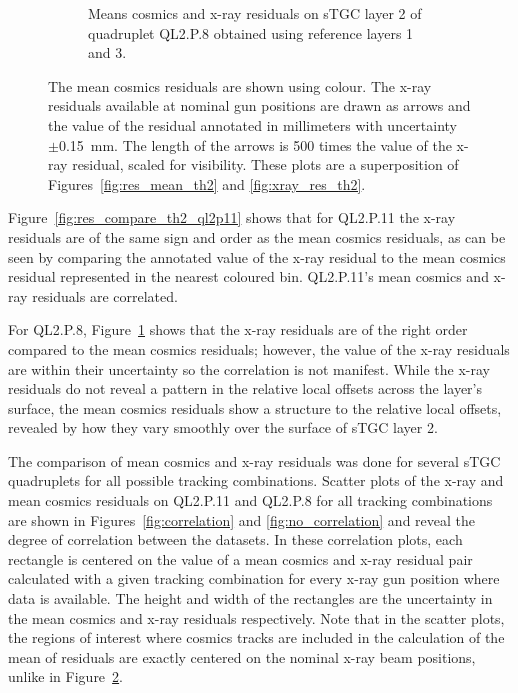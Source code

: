 \begin{figure}
\begin{subfigure}{\textwidth}
  \caption{Means cosmics and x-ray residuals on sTGC layer 2 of quadruplet QL2.P.8 obtained using reference layers 1 and 3.}
  \label{fig:res_compare_th2_ql2p8}
\end{subfigure}
\caption{The mean cosmics residuals are shown using colour. The x-ray residuals available at nominal gun positions are drawn as arrows and the value of the residual annotated in millimeters with uncertainty $\pm$\SI{0.15}{mm}. The length of the arrows is 500 times the value of the x-ray residual, scaled for visibility. These plots are a superposition of Figures~\ref{fig:res_mean_th2} and \ref{fig:xray_res_th2}.}
\label{fig:res_compare_th2}
\end{figure}
\newpage
\restoregeometry

Figure~\ref{fig:res_compare_th2_ql2p11} shows that for QL2.P.11 the x-ray residuals are of the same sign and order as the mean cosmics residuals, as can be seen by comparing the annotated value of the x-ray residual to the mean cosmics residual represented in the nearest coloured bin. QL2.P.11's mean cosmics and x-ray residuals are correlated. 

For QL2.P.8, Figure~\ref{fig:res_compare_th2_ql2p8} shows that the x-ray residuals are of the right order compared to the mean cosmics residuals; however, the value of the x-ray residuals are within their uncertainty so the correlation is not manifest. While the x-ray residuals do not reveal a pattern in the relative local offsets across the layer's surface, the mean cosmics residuals show a structure to the relative local offsets, revealed by how they vary smoothly over the surface of sTGC layer 2. 

The comparison of mean cosmics and x-ray residuals was done for several sTGC quadruplets for all possible tracking combinations. Scatter plots of the x-ray and mean cosmics residuals on QL2.P.11 and QL2.P.8 for all tracking combinations are shown in Figures~\ref{fig:correlation} and \ref{fig:no_correlation} and reveal the degree of correlation between the datasets. In these correlation plots, each rectangle is centered on the value of a mean cosmics and x-ray residual pair calculated with a given tracking combination for every x-ray gun position where data is available. The height and width of the rectangles are the uncertainty in the mean cosmics and x-ray residuals respectively. Note that in the scatter plots, the regions of interest where cosmics tracks are included in the calculation of the mean of residuals are exactly centered on the nominal x-ray beam positions, unlike in Figure~\ref{fig:res_compare_th2}.

